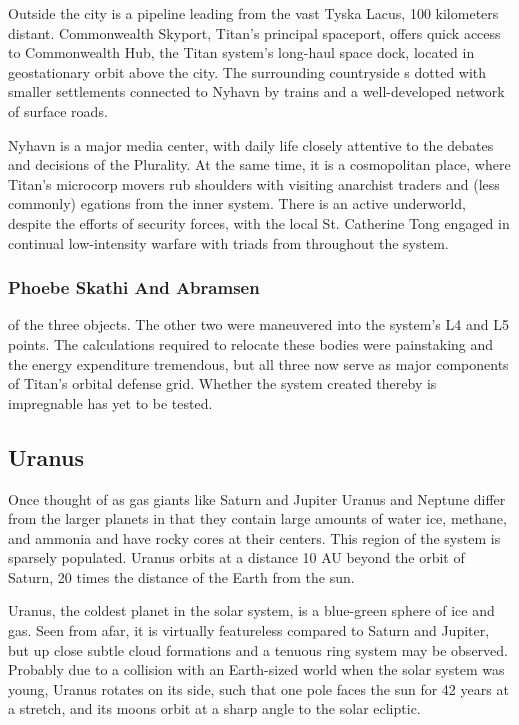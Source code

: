 Outside the city is a pipeline  leading  from the 
vast Tyska Lacus, 100 kilometers distant. Commonwealth
Skyport, Titan's principal spaceport, offers
quick access to Commonwealth Hub, the Titan system's
long-haul space dock, located in geostationary
orbit above the city. The surrounding countryside 
s  dotted  with smaller settlements connected  to
Nyhavn by trains and a well-developed network of 
surface roads.

Nyhavn is a major media center, with daily life 
closely attentive to the debates and decisions of 
the Plurality. At the same time, it is a cosmopolitan
place, where Titan's microcorp movers rub shoulders
with visiting anarchist traders and (less commonly) 
egations from the inner system. There is an active 
underworld,  despite the efforts of security  forces, 
with the local St. Catherine Tong engaged in continual
low-intensity warfare with triads from throughout
the system.

\subsubsection{Phoebe Skathi And Abramsen}

of the three objects. The other two 
were maneuvered into the system's L4 
and L5 points. The calculations required 
to relocate these bodies were painstaking
and the energy expenditure tremendous,
but all three now serve as major components of 
Titan's orbital defense grid. Whether the system created
thereby is impregnable has yet to be tested.

\subsection{Uranus}

Once thought of as gas giants like Saturn and Jupiter
Uranus and Neptune differ from the larger
planets in that they contain large amounts of water 
ice, methane, and ammonia and have rocky cores at 
their centers. This region of the system is sparsely 
populated. Uranus orbits at a distance 10 AU beyond 
the orbit of Saturn, 20 times the distance of the Earth 
from the sun.

Uranus, the coldest planet in the solar system, is a 
blue-green sphere of ice and gas. Seen from afar, it is 
virtually featureless compared to Saturn and Jupiter, 
but up close subtle cloud formations and a tenuous 
ring system may be observed. Probably due to a collision
with an Earth-sized world when the solar system
was young, Uranus rotates on its side, such that one 
pole faces the sun for 42 years at a stretch, and its 
moons orbit at a sharp angle to the solar ecliptic.

